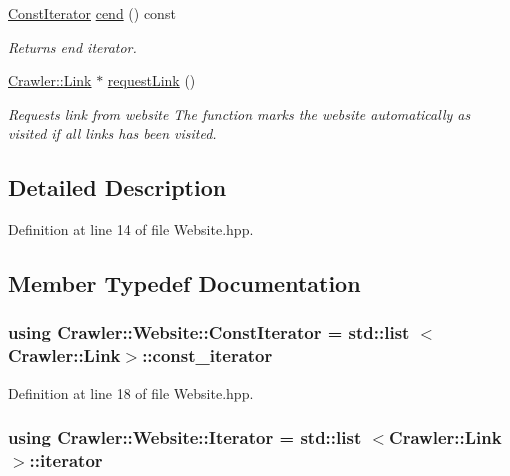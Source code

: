 \begin{DoxyCompactItemize}
\hyperlink{class_crawler_1_1_website_acfbc2b2241aa025f4fc57965dfe69fdb}{Const\+Iterator} \hyperlink{class_crawler_1_1_website_a25f7e9a65365639f78decdffd4406453}{cend} () const 
\begin{DoxyCompactList}\small\item\em Returns end iterator. \end{DoxyCompactList}\item 
\hyperlink{class_crawler_1_1_link}{Crawler\+::\+Link} $\ast$ \hyperlink{class_crawler_1_1_website_a1131a5af4ca3680410de2875ffcd1d2e}{request\+Link} ()
\begin{DoxyCompactList}\small\item\em Requests link from website The function marks the website automatically as visited if all links has been visited. \end{DoxyCompactList}\end{DoxyCompactItemize}


\subsection{Detailed Description}


Definition at line 14 of file Website.\+hpp.



\subsection{Member Typedef Documentation}
\hypertarget{class_crawler_1_1_website_acfbc2b2241aa025f4fc57965dfe69fdb}{}
\subsubsection[{Const\+Iterator}]{\setlength{\rightskip}{0pt plus 5cm}using {\bf Crawler\+::\+Website\+::\+Const\+Iterator} =  std\+::list $<${\bf Crawler\+::\+Link}$>$\+::const\+\_\+iterator}\label{class_crawler_1_1_website_acfbc2b2241aa025f4fc57965dfe69fdb}


Definition at line 18 of file Website.\+hpp.

\hypertarget{class_crawler_1_1_website_ad323c2cfd249fc9cd2692c00eb50c0c9}{}
\subsubsection[{Iterator}]{\setlength{\rightskip}{0pt plus 5cm}using {\bf Crawler\+::\+Website\+::\+Iterator} =  std\+::list $<${\bf Crawler\+::\+Link}$>$\+::iterator}\label{class_crawler_1_1_website_ad323c2cfd249fc9cd2692c00eb50c0c9}


